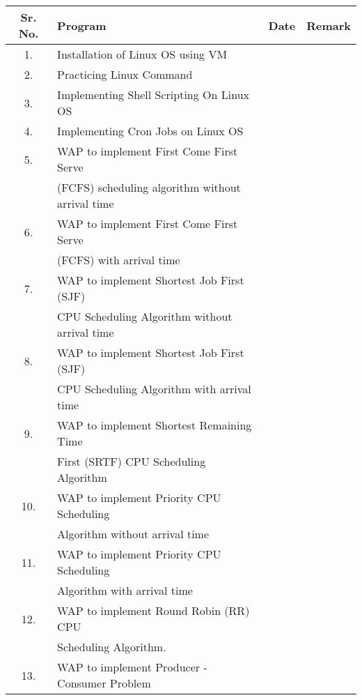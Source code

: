 \documentclass[13pt,a4paper,oneside]{article}
\begin{document}
\begin{center}
	\begin{table}[h]
		\begin{tabular}{ || c || l || c || c || }
			\hline
			\textbf{Sr. No.} & \textbf{Program} & \textbf{Date} & \textbf{Remark} \\
			\hline
			1. & Installation of Linux OS using VM & & \\
			\hline
			2. & Practicing Linux Command & & \\
			\hline
			3. & Implementing Shell Scripting On Linux OS & & \\
			\hline
			4. & Implementing Cron Jobs on Linux OS & & \\
			\hline
			5. & WAP to implement First Come First Serve & & \\ & (FCFS) scheduling algorithm without arrival time & & \\
			\hline
			6. & WAP to implement First Come First Serve & & \\ & (FCFS) with arrival time & & \\
			\hline
			7. & WAP to implement Shortest Job First (SJF) & & \\ & CPU Scheduling Algorithm without arrival time & & \\
			\hline
			8. & WAP to implement Shortest Job First (SJF) & & \\ & CPU Scheduling Algorithm with arrival time & & \\
			\hline
			9. & WAP to implement Shortest Remaining Time & & \\ & First (SRTF) CPU Scheduling Algorithm & & \\
			\hline
			10. & WAP to implement Priority CPU Scheduling & & \\ & Algorithm without arrival time & & \\
			\hline
			11. & WAP to implement Priority CPU Scheduling & & \\ & Algorithm with arrival time & & \\
			\hline
			12. & WAP to implement Round Robin (RR) CPU & & \\ & Scheduling Algorithm. & & \\
			\hline
			13. & WAP to implement Producer - Consumer Problem & & \\
			\hline
		\end{tabular}
	\end{table}
\end{center}
\end{document}
